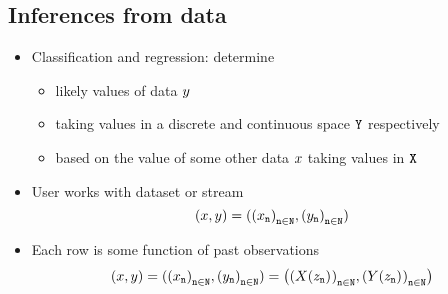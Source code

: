 \documentclass{article}
\begin{document}
\subsection{Inferences from data}
\begin{itemize}
  \item
    Classification and regression: determine\
  \begin{itemize}
  \item
    likely values of data $\Targ$
  \item
    taking values in a discrete and continuous space $\OUT$ respectively
  \item
    based on the value of some other data $\Feat$ taking values in $\IN$
\end{itemize}
  \item
    User works with dataset or stream
    $$
    (\Feat,\targ)=(\ENUM[\Feat],\ENUM[\targ])
    $$
  \item
    Each row is some function of past observations
    $$
    (\Feat,\targ)=(\ENUM[\Feat],\ENUM[\targ])=\left(\ENUM[\FEAT(\Obs_{\ind})][][\ROWS][\ind\in],\ENUM[\TARG(\Obs_{\ind})][][\ROWS][\ind\in]\right)
    $$
\end{itemize}
\end{document}
